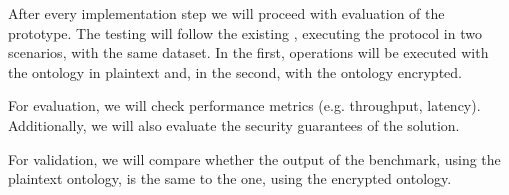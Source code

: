 After every implementation step we will proceed with evaluation of the prototype. The testing will follow the existing  \autocite{Chris_undated-hq}, executing the protocol in two scenarios, with the same dataset. In the first, operations will be executed with the ontology in plaintext and, in the second, with the ontology encrypted. 

For evaluation, we will check performance metrics (e.g. throughput, latency). Additionally, we will also evaluate the security guarantees of the solution.

For validation, we will compare whether the output of the benchmark, using the plaintext ontology, is the same to the one, using the encrypted ontology. 